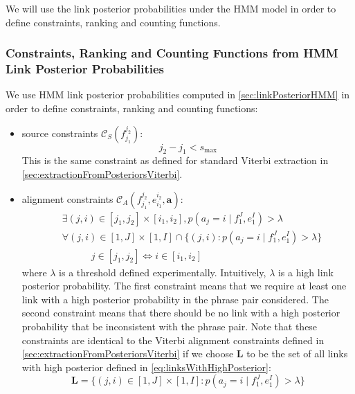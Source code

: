 We will use the link posterior probabilities under the HMM model
in order to define constraints, ranking and counting functions.

\subsubsection{Constraints, Ranking and Counting Functions from HMM Link Posterior Probabilities}

We use HMM link posterior probabilities computed in \autoref{sec:linkPosteriorHMM}
in order to define constraints, ranking and counting functions:
%
\begin{itemize}
  \item source constraints $\mathcal{C}_S(f_{j_1}^{j_2})$:
%
\begin{equation}
  j_2 - j_1  < s_{\text{max}}
\end{equation}
%
This is the same constraint as defined for standard Viterbi extraction in
\autoref{sec:extractionFromPosteriorsViterbi}.
  \item alignment constraints $\mathcal{C}_A(f_{j_1}^{j_2}, e_{i_1}^{i_2}, \bm{a})$:
%
\begin{equation}
  \begin{split}
    & \exists (j,i) \in [j_1,j_2] \times [i_1,i_2], p(a_j = i \mid f_1^J,e_1^I) > \lambda \\
    & \forall (j,i) \in [1, J] \times [1, I] \cap \{(j,i): p(a_j = i \mid f_1^J,e_1^I) > \lambda\} \\
    & \hspace{3em} j \in [j_1, j_2] \Leftrightarrow i \in [i_1, i_2]
  \end{split}
\end{equation}
%
where $\lambda$ is a threshold defined experimentally. Intuitively,
$\lambda$ is a high link posterior probability.
The first constraint means that we require at least one link with a
high posterior probability in the phrase pair considered. The second
constraint means that there should be no link with a high posterior probability
that be inconsistent with the phrase pair. Note that these constraints are
identical to the Viterbi alignment constraints defined
in \autoref{sec:extractionFromPosteriorsViterbi} if we choose $\bm{L}$ to be the
set of all links with high posterior defined in \autoref{eq:linksWithHighPosterior}:
%
\begin{equation}
  \bm{L} = \{(j, i) \in [1, J] \times [1, I]: p(a_j = i \mid f_1^J,e_1^I) > \lambda\}
  \label{eq:linksWithHighPosterior}
\end{equation}

\end{itemize}
